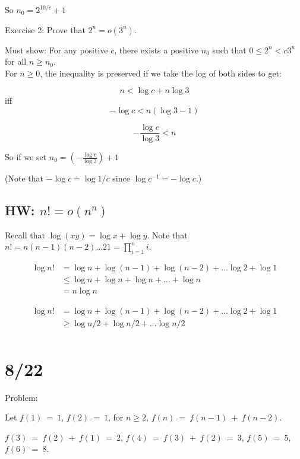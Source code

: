 \documentclass{article}
\begin{document}
So $n_0 = 2^{10/c} + 1$

Exercise 2:
Prove that $2^n = o(3^n)$.

Must show:  For any positive $c$, there exists a positive $n_0$ such that
$0 \leq 2^n < c 3^n$ for all $n \geq n_0$.\\
For $n \geq 0$, the inequality is preserved if we take the log of both sides to get:

$$ n < \log c + n \log 3  $$
iff
$$ - \log c < n( \log 3 -1) $$

$$ - \frac{\log c}{\log 3} < n $$

So if we set $n_0 = (- \frac{\log c}{\log 3}) + 1$

(Note that $- \log c = \log 1/c$ since $\log c^{-1} = - \log c$.)

\medskip

\subsection{HW: $n! = o(n^n)$}

\medskip

Recall that $\log (xy) = \log x + \log y$.  Note that $n! = n (n-1) (n-2) \ldots 2 1 = \prod_{i=1}^n i$.

\begin{align*}
    \log n! & = \log n + \log (n-1) + \log (n-2) + \ldots \log 2 + \log 1 \\
    & \leq \log n + \log n + \log n + \ldots + \log n\\
    & = n \log n
\end{align*}

\begin{align*}
    \log n! & = \log n + \log (n-1) + \log (n-2) + \ldots \log 2 + \log 1 \\
    & \geq \log n/2 + \log n/2 + \ldots \log n/2 \\
\end{align*}

\section{8/22}
Problem:

Let $\displaystyle f( 1) \ =\ 1$, $\displaystyle f( 2) \ =\ 1$, for $\displaystyle n\geq 2$, $\displaystyle f( n) \ =\ f( n-1) \ +\ f( n-2)$.

$\displaystyle f( 3) \ =\ f( 2) \ +\ f( 1) \ =\ 2$, $\displaystyle f( 4) \ =\ f( 3) \ +\ f( 2) \ =\ 3$, $\displaystyle f( 5) \ =\ 5$, $\displaystyle f( 6) \ =\ 8$.	
\end{document}
